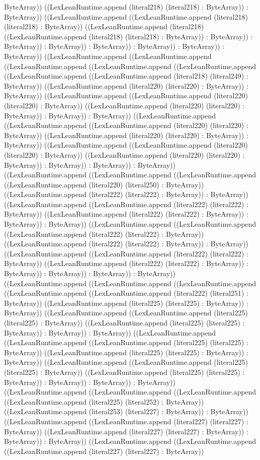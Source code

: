\documentclass[11pt]{article}
\begin{document}
ByteArray)) ((LexLeanRuntime.append (literal218) (literal218) : ByteArray)) : ByteArray)) ((LexLeanRuntime.append ((LexLeanRuntime.append (literal218) (literal218) : ByteArray)) ((LexLeanRuntime.append (literal218) ((LexLeanRuntime.append (literal218) (literal218) : ByteArray)) : ByteArray)) : ByteArray)) : ByteArray)) : ByteArray)) : ByteArray)) : ByteArray)) : ByteArray)) ((LexLeanRuntime.append ((LexLeanRuntime.append ((LexLeanRuntime.append ((LexLeanRuntime.append ((LexLeanRuntime.append ((LexLeanRuntime.append ((LexLeanRuntime.append (literal218) (literal249) : ByteArray)) ((LexLeanRuntime.append (literal220) (literal220) : ByteArray)) : ByteArray)) ((LexLeanRuntime.append ((LexLeanRuntime.append (literal220) (literal220) : ByteArray)) ((LexLeanRuntime.append (literal220) (literal220) : ByteArray)) : ByteArray)) : ByteArray)) ((LexLeanRuntime.append ((LexLeanRuntime.append ((LexLeanRuntime.append (literal220) (literal220) : ByteArray)) ((LexLeanRuntime.append (literal220) (literal220) : ByteArray)) : ByteArray)) ((LexLeanRuntime.append ((LexLeanRuntime.append (literal220) (literal220) : ByteArray)) ((LexLeanRuntime.append (literal220) (literal220) : ByteArray)) : ByteArray)) : ByteArray)) : ByteArray)) ((LexLeanRuntime.append ((LexLeanRuntime.append ((LexLeanRuntime.append ((LexLeanRuntime.append (literal220) (literal250) : ByteArray)) ((LexLeanRuntime.append (literal222) (literal222) : ByteArray)) : ByteArray)) ((LexLeanRuntime.append ((LexLeanRuntime.append (literal222) (literal222) : ByteArray)) ((LexLeanRuntime.append (literal222) (literal222) : ByteArray)) : ByteArray)) : ByteArray)) ((LexLeanRuntime.append ((LexLeanRuntime.append ((LexLeanRuntime.append (literal222) (literal222) : ByteArray)) ((LexLeanRuntime.append (literal222) (literal222) : ByteArray)) : ByteArray)) ((LexLeanRuntime.append ((LexLeanRuntime.append (literal222) (literal222) : ByteArray)) ((LexLeanRuntime.append (literal222) (literal222) : ByteArray)) : ByteArray)) : ByteArray)) : ByteArray)) : ByteArray)) ((LexLeanRuntime.append ((LexLeanRuntime.append ((LexLeanRuntime.append ((LexLeanRuntime.append ((LexLeanRuntime.append (literal222) (literal251) : ByteArray)) ((LexLeanRuntime.append (literal225) (literal225) : ByteArray)) : ByteArray)) ((LexLeanRuntime.append ((LexLeanRuntime.append (literal225) (literal225) : ByteArray)) ((LexLeanRuntime.append (literal225) (literal225) : ByteArray)) : ByteArray)) : ByteArray)) ((LexLeanRuntime.append ((LexLeanRuntime.append ((LexLeanRuntime.append (literal225) (literal225) : ByteArray)) ((LexLeanRuntime.append (literal225) (literal225) : ByteArray)) : ByteArray)) ((LexLeanRuntime.append ((LexLeanRuntime.append (literal225) (literal225) : ByteArray)) ((LexLeanRuntime.append (literal225) (literal225) : ByteArray)) : ByteArray)) : ByteArray)) : ByteArray)) ((LexLeanRuntime.append ((LexLeanRuntime.append ((LexLeanRuntime.append ((LexLeanRuntime.append (literal225) (literal252) : ByteArray)) ((LexLeanRuntime.append (literal253) (literal227) : ByteArray)) : ByteArray)) ((LexLeanRuntime.append ((LexLeanRuntime.append (literal227) (literal227) : ByteArray)) ((LexLeanRuntime.append (literal227) (literal227) : ByteArray)) : ByteArray)) : ByteArray)) ((LexLeanRuntime.append ((LexLeanRuntime.append ((LexLeanRuntime.append (literal227) (literal227) : ByteArray)) 
\end{document}
